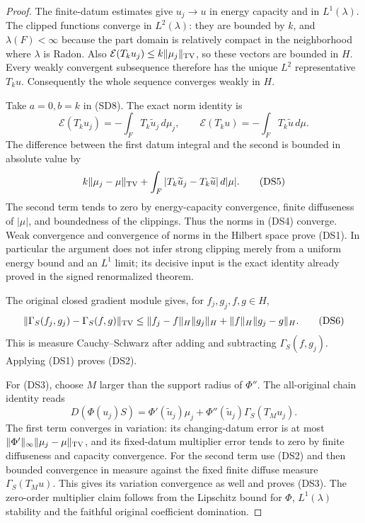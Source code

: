 \begin{proof}
The finite-datum estimates give $u_j\to u$ in energy capacity
and in $L^1(\lambda)$.  The clipped functions converge in
$L^2(\lambda)$: they are bounded by $k$, and $\lambda(F)<\infty$
because the part domain is relatively compact in the neighborhood
where $\lambda$ is Radon.  Also
$\mathcal E(T_ku_j)\leq k\|\mu_j\|_{\rm TV}$, so these
vectors are bounded in $H$.  Every weakly convergent subsequence
therefore has the unique $L^2$ representative $T_ku$.
Consequently the whole sequence converges weakly in $H$.

Take $a=0,b=k$ in (SD8).  The exact norm identity is
\[
 \mathcal E(T_ku_j)=-\int_F T_k\widetilde u_j\,d\mu_j,
 \qquad
 \mathcal E(T_ku)=-\int_F T_k\widetilde u\,d\mu.
 \tag{DS4}
\]
The difference between the first datum integral and the second
is bounded in absolute value by
\[
 k\|\mu_j-\mu\|_{\rm TV}
       +\int_F|T_k\widetilde u_j-T_k\widetilde u|\,d|\mu|.
 \tag{DS5}
\]
The second term tends to zero by energy-capacity convergence,
finite diffuseness of $|\mu|$, and boundedness of the clippings.
Thus the norms in (DS4) converge.  Weak convergence and convergence
of norms in the Hilbert space prove (DS1).  In particular the
argument does not infer strong clipping merely from a uniform
energy bound and an $L^1$ limit; its decisive input is the exact
identity already proved in the signed renormalized theorem.

The original closed gradient module gives, for $f_j,g_j,f,g\in H$,
\[
 \|\Gamma_S(f_j,g_j)-\Gamma_S(f,g)\|_{\rm TV}
  \leq \|f_j-f\|_H\|g_j\|_H
                         +\|f\|_H\|g_j-g\|_H.
 \tag{DS6}
\]
This is measure Cauchy--Schwarz after adding and subtracting
$\Gamma_S(f,g_j)$.  Applying (DS1) proves (DS2).

For (DS3), choose $M$ larger than the support radius of $\Phi''$.
The all-original chain identity reads
\[
 D(\Phi(u_j)S)=\Phi'(\widetilde u_j)\mu_j
       +\Phi''(\widetilde u_j)\Gamma_S(T_Mu_j).
 \tag{DS7}
\]
The first term converges in variation: its changing-datum error
is at most $\|\Phi'\|_\infty\|\mu_j-\mu\|_{\rm TV}$,
and its fixed-datum multiplier error tends to zero by finite
diffuseness and capacity convergence.  For the second term use
(DS2) and then bounded convergence in measure against the fixed
finite diffuse measure $\Gamma_S(T_Mu)$.  This gives its variation
convergence as well and proves (DS3).  The zero-order multiplier
claim follows from the Lipschitz bound for $\Phi$, $L^1(\lambda)$
stability and the faithful original coefficient domination.


\end{proof}
